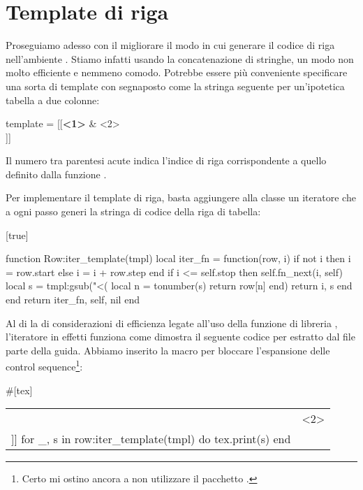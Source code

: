 \section{Template di riga}

Proseguiamo adesso con il migliorare il modo in cui generare il codice di riga
nell'ambiente . Stiamo infatti usando la concatenazione di
stringhe, un modo non molto efficiente e nemmeno comodo. Potrebbe essere più
conveniente specificare una sorta di template con segnaposto come la stringa
seguente per un'ipotetica tabella a due colonne:
\begin{lines}
template = [[\textbf{<1>} & <2>\\]]
\end{lines}

Il numero tra parentesi acute \code{<>} indica l'indice di riga corrispondente a
quello definito dalla funzione .

Per implementare il template di riga, basta aggiungere alla classe  un
iteratore che a ogni passo generi la stringa di codice della riga di tabella:

[true]
%
%
%
%
\begin{lines}
function Row:iter_template(tmpl)
    local iter_fn = function(row, i)
        if not i then
            i = row.start
        else
            i = i + row.step
        end
        if i <= self.stop then
            self.fn_next(i, self)
            local s = tmpl:gsub("<(%
                local n = tonumber(s)
                return row[n]
            end)
            return i, s
        end
    end
    return iter_fn, self, nil
end
\end{lines}

Al di la di considerazioni di efficienza legate all'uso della funzione di
libreria , l'iteratore in effetti funziona come dimostra il seguente
codice per \LuaLaTeX{} estratto dal file  parte
della guida. Abbiamo inserito la macro  per bloccare l'espansione
delle control sequence\footnote{Certo mi ostino ancora a non utilizzare il
pacchetto .}:
\begin{lines}
#[tex]
\begin{tabular}{lr}
\directlua{
local tmpl = [[\noexpand\textbf{<1>} & <2>\noexpand\\]]
for _, s in row:iter_template(tmpl) do
   tex.print(s)
end
}
\end{tabular}
\end{lines}

